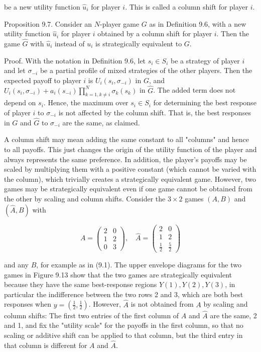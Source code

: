 \documentclass[12pt]{article}
\begin{document}
be a new utility function $\hat{u}_{i}$ for player $i$. This is called a column shift for player $i$.

Proposition 9.7. Consider an $N$-player game $G$ as in Definition 9.6, with a new utility function $\hat{u}_{i}$ for player $i$ obtained by a column shift for player $i$. Then the game $\hat{G}$ with $\hat{u}_{i}$ instead of $u_{i}$ is strategically equivalent to $G$.

Proof. With the notation in Definition 9.6, let $s_{i} \in S_{i}$ be a strategy of player $i$ and let $\sigma_{-i}$ be a partial profile of mixed strategies of the other players. Then the expected payoff to player $i$ is $U_{i}\left(s_{i}, \sigma_{-i}\right)$ in $G$, and $U_{i}\left(s_{i}, \sigma_{-i}\right)+a_{i}\left(s_{-i}\right) \prod_{k=1, k \neq i}^{N} \sigma_{k}\left(s_{k}\right)$ in $\hat{G}$. The added term does not depend on $s_{i}$. Hence, the maximum over $s_{i} \in S_{i}$ for determining the best response of player $i$ to $\sigma_{-i}$ is not affected by the column shift. That is, the best responses in $G$ and $\hat{G}$ to $\sigma_{-i}$ are the same, as claimed.

A column shift may mean adding the same constant to all "columns" and hence to all payoffs. This just changes the origin of the utility function of the player and always represents the same preference. In addition, the player's payoffs may be scaled by multiplying them with a positive constant (which cannot be varied with the column), which trivially creates a strategically equivalent game. However, two games may be strategically equivalent even if one game cannot be obtained from the other by scaling and column shifts. Consider the $3 \times 2$ games $(A, B)$ and $(\hat{A}, B)$ with

\[
A=\left(\begin{array}{ll}
2 & 0  \tag{9.10}\\
1 & 2 \\
0 & 3
\end{array}\right), \quad \hat{A}=\left(\begin{array}{ll}
2 & 0 \\
1 & 2 \\
\frac{1}{2} & \frac{5}{2}
\end{array}\right)
\]

and any $B$, for example as in (9.1). The upper envelope diagrams for the two games in Figure 9.13 show that the two games are strategically equivalent because they have the same best-response regions $Y(1), Y(2), Y(3)$, in particular the indifference between the two rows 2 and 3, which are both best responses when $y=\left(\frac{1}{2}, \frac{1}{2}\right)$. However, $\hat{A}$ is not obtained from $A$ by scaling and column shifts: The first two entries of the first column of $A$ and $\hat{A}$ are the same, 2 and 1, and fix the "utility scale" for the payoffs in the first column, so that no scaling or additive shift can be applied to that column, but the third entry in that column is different for $A$ and $\hat{A}$.
\end{document}
